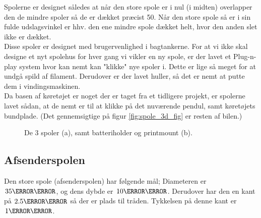 Spolerne er designet således at når den store spole er i nul (i midten) overlapper den de mindre spoler så de er dækket præcist 50\percent. Når den store spole så er i sin fulde udslagsvinkel er hhv. den ene mindre spole dækket helt, hvor den anden slet ikke er dækket. \\

Disse spoler er designet med brugervenlighed i bagtankerne. For at vi ikke skal designe et nyt spolehus for hver gang vi vikler en ny spole, er der lavet et Plug-n-play system hvor kan nemt kan "klikke" nye spoler i. Dette er lige så meget for at undgå spild af filament. Derudover er der lavet huller, så det er nemt at putte dem i vindingsmaskinen. \\

Da basen af køretøjet er noget der er taget fra et tidligere projekt, er spolerne lavet sådan, at de nemt er til at klikke på det nuværende pendul, samt køretøjets bundplade. (Det gennemsigtige på figur \ref{fig:spole_3d_fig} er resten af bilen.)

\begin{figure}[h!]
	\centering
	\caption{De 3 spoler (a), samt batteriholder og printmount (b).}
\end{figure}

\subsection{Afsenderspolen}
Den store spole (afsenderspolen) har følgende mål; 
Diameteren er $35\milli\meter$, og dens dybde er $10\milli\meter$. Derudover har den en kant på $2.5\milli\meter$ så der er plads til tråden. Tykkelsen på denne kant er $1\milli\meter$. 

